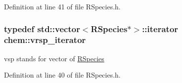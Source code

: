 Definition at line 41 of file R\-Species.\-h.

\hypertarget{namespacechem_a9b02b32d43473a3cd87fd30f910cc121}{
\subsubsection[{vrsp\-\_\-iterator}]{\setlength{\rightskip}{0pt plus 5cm}typedef std\-::vector$<${\bf R\-Species}$\ast$$>$\-::iterator {\bf chem\-::vrsp\-\_\-iterator}}}\label{namespacechem_a9b02b32d43473a3cd87fd30f910cc121}


vsp stands for vector of \hyperlink{classchem_1_1RSpecies}{R\-Species} 



Definition at line 40 of file R\-Species.\-h.



